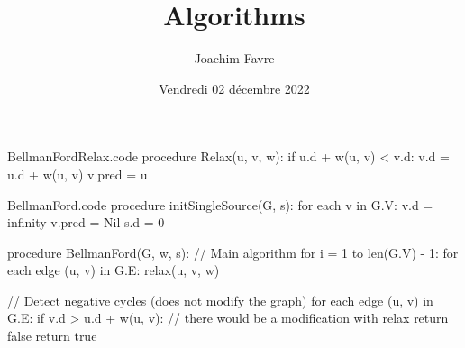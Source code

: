 \documentclass[a4paper]{article}
\title{Algorithms}
\author{Joachim Favre}
\date{Vendredi 02 décembre 2022}
\begin{document}
\maketitle


\begin{filecontents*}[overwrite]{BellmanFordRelax.code}
procedure Relax(u, v, w):
    if u.d + w(u, v) < v.d:
        v.d = u.d + w(u, v)
        v.pred = u
\end{filecontents*}

\begin{filecontents*}[overwrite]{BellmanFord.code}
procedure initSingleSource(G, s):
    for each v in G.V:
        v.d = infinity
        v.pred = Nil
    s.d = 0

procedure BellmanFord(G, w, s):
    // Main algorithm
    for i = 1 to len(G.V) - 1:
        for each edge (u, v) in G.E:
            relax(u, v, w)

    // Detect negative cycles (does not modify the graph)
    for each edge (u, v) in G.E:
        if v.d > u.d + w(u, v):  // there would be a modification with relax
            return false
    return true
\end{filecontents*}
\end{document}
